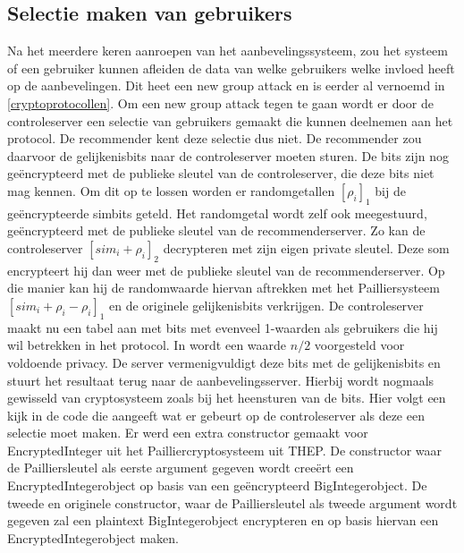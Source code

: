 \subsection{Selectie maken van gebruikers}
\label{selection}
Na het meerdere keren aanroepen van het aanbevelingssysteem, zou het systeem of een gebruiker kunnen afleiden de data van welke gebruikers welke invloed heeft op de aanbevelingen. Dit heet een new group attack en is eerder al vernoemd in \ref{cryptoprotocollen}. Om een new group attack tegen te gaan wordt er door de controleserver een selectie van gebruikers gemaakt die kunnen deelnemen aan het protocol. De recommender kent deze selectie dus niet. De recommender zou daarvoor de gelijkenisbits naar de controleserver moeten sturen. De bits zijn nog ge\"encrypteerd met de publieke sleutel van de controleserver, die deze bits niet mag kennen. Om dit op te lossen worden er randomgetallen $[\rho_i]_1$ bij de ge\"encrypteerde simbits geteld. Het randomgetal wordt zelf ook meegestuurd, ge\"encrypteerd met de publieke sleutel van de recommenderserver. Zo kan de controleserver $[sim_i+\rho_i]_2$ decrypteren met zijn eigen private sleutel. Deze som encrypteert hij dan weer met de publieke sleutel van de recommenderserver. Op die manier kan hij de randomwaarde hiervan aftrekken met het Pailliersysteem $[sim_i+\rho_i-\rho_i]_1$ en de originele gelijkenisbits verkrijgen. De controleserver maakt nu een tabel aan met bits met evenveel 1-waarden als gebruikers die hij wil betrekken in het protocol. In \cite{ZErkinDyn} wordt een waarde $n/2$ voorgesteld voor voldoende privacy. De server vermenigvuldigt deze bits met de gelijkenisbits en stuurt het resultaat terug naar de aanbevelingsserver. Hierbij wordt nogmaals gewisseld van cryptosysteem zoals bij het heensturen van de bits. Hier volgt een kijk in de code die aangeeft wat er gebeurt op de controleserver als deze een selectie moet maken. Er werd een extra constructor gemaakt voor EncryptedInteger uit het Pailliercryptosysteem uit THEP. De constructor waar de Pailliersleutel als eerste argument gegeven wordt cree\"ert een EncryptedIntegerobject op basis van een ge\"encrypteerd BigIntegerobject. De tweede en originele constructor, waar de Pailliersleutel als tweede argument wordt gegeven zal een plaintext BigIntegerobject encrypteren en op basis hiervan een EncryptedIntegerobject maken.

